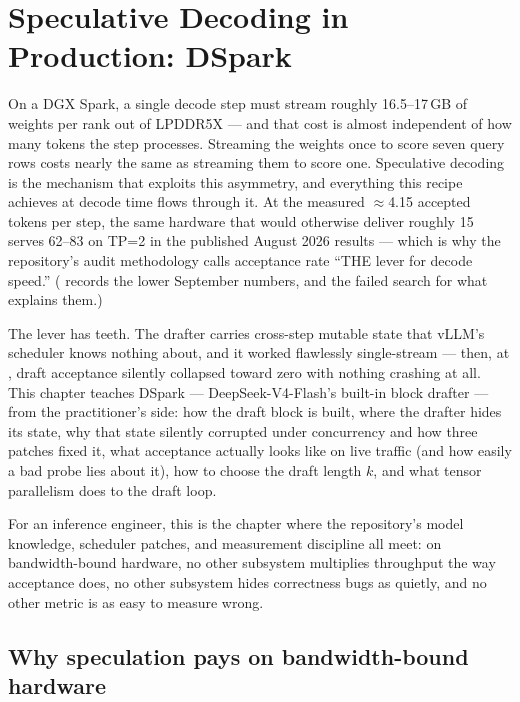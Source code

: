 \chapter{Speculative Decoding in Production: DSpark}
\label{ch:specdecode}

On a DGX Spark, a single decode step must stream roughly 16.5--17\,GB of
weights per rank out of LPDDR5X --- and that cost is almost independent of
how many tokens the step processes. Streaming the weights once to score seven
query rows costs nearly the same as streaming them to score one. Speculative
decoding is the mechanism that exploits this asymmetry, and everything this
recipe achieves at decode time flows through it. At the measured
$\approx$4.15 accepted tokens per step, the same hardware that would
otherwise deliver roughly 15 \tokspersec{} serves 62--83 \tokspersec{}
on TP=2 in the published August 2026 results --- which is why the
repository's audit methodology calls acceptance rate ``THE lever for decode
speed.'' ( records the lower September numbers, and the failed
search for what explains them.)

The lever has teeth. The drafter carries cross-step mutable state that vLLM's
scheduler knows nothing about, and it worked flawlessly single-stream ---
then, at , draft acceptance silently collapsed toward
zero with nothing crashing at all. This chapter teaches DSpark ---
DeepSeek-V4-Flash's built-in block drafter --- from the practitioner's side:
how the draft block is built, where the drafter hides its state, why that
state silently corrupted under concurrency and how three patches fixed it,
what acceptance actually looks like on live traffic (and how easily a bad
probe lies about it), how to choose the draft length $k$, and what tensor
parallelism does to the draft loop.

For an inference engineer, this is the chapter where the repository's model
knowledge, scheduler patches, and measurement discipline all meet: on
bandwidth-bound hardware, no other subsystem multiplies throughput the way
acceptance does, no other subsystem hides correctness bugs as quietly, and
no other metric is as easy to measure wrong.

\section{Why speculation pays on bandwidth-bound hardware}
\label{sec:specdecode-economics}

